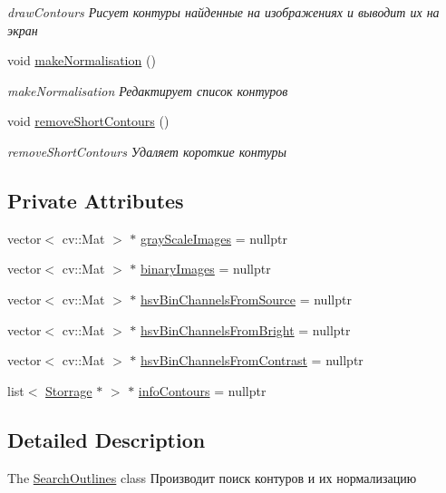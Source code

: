 \begin{DoxyCompactItemize}
\begin{DoxyCompactList}\small\item\em draw\+Contours Рисует контуры найденные на изображениях и выводит их на экран \end{DoxyCompactList}\item 
void \hyperlink{class_search_outlines_a09da9c6586707297e2012403a497c6be}{make\+Normalisation} ()
\begin{DoxyCompactList}\small\item\em make\+Normalisation Редактирует список контуров \end{DoxyCompactList}\item 
void \hyperlink{class_search_outlines_ae2be53580b1029487fb5e5e2ab6c49a3}{remove\+Short\+Contours} ()
\begin{DoxyCompactList}\small\item\em remove\+Short\+Contours Удаляет короткие контуры \end{DoxyCompactList}\end{DoxyCompactItemize}
\subsection*{Private Attributes}
\begin{DoxyCompactItemize}
\item 
vector$<$ cv\+::\+Mat $>$ $\ast$ \hyperlink{class_search_outlines_a2284f3f55022613e11f2d023a6b76e07}{gray\+Scale\+Images} = nullptr
\item 
vector$<$ cv\+::\+Mat $>$ $\ast$ \hyperlink{class_search_outlines_ad32573709b7db29f00e5444110b37d23}{binary\+Images} = nullptr
\item 
vector$<$ cv\+::\+Mat $>$ $\ast$ \hyperlink{class_search_outlines_a455efed931c502f14dbf88c87974214d}{hsv\+Bin\+Channels\+From\+Source} = nullptr
\item 
vector$<$ cv\+::\+Mat $>$ $\ast$ \hyperlink{class_search_outlines_a1eb23566d056c92a441067d8c9cd03ae}{hsv\+Bin\+Channels\+From\+Bright} = nullptr
\item 
vector$<$ cv\+::\+Mat $>$ $\ast$ \hyperlink{class_search_outlines_a236b9910b73900271297548d3744d506}{hsv\+Bin\+Channels\+From\+Contrast} = nullptr
\item 
list$<$ \hyperlink{class_storrage}{Storrage} $\ast$ $>$ $\ast$ \hyperlink{class_search_outlines_a1b1d7e6dd5c6c2b30c397f9f6d712dd1}{info\+Contours} = nullptr
\end{DoxyCompactItemize}


\subsection{Detailed Description}
The \hyperlink{class_search_outlines}{Search\+Outlines} class Производит поиск контуров и их нормализацию 

